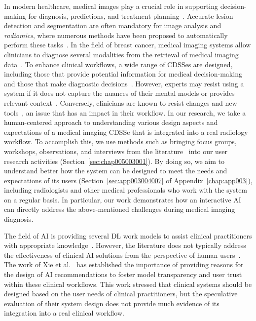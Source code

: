 In modern healthcare, medical images play a crucial role in supporting decision-making for diagnosis, predictions, and treatment planning~\cite{liang2019deep}.
Accurate lesion detection and segmentation are often mandatory for image analysis and {\it radiomics}, where numerous methods have been proposed to automatically perform these tasks~\cite{litjens2017survey}.
In the field of breast cancer, medical imaging systems allow clinicians to diagnose several modalities from the retrieval of medical imaging data~\cite{seifabadi2019correlation}.
To enhance clinical workflows, a wide range of \acp{CDSSe} are designed, including those that provide potential information for medical decision-making and those that make diagnostic decisions~\cite{10.1145/3290605.3300234, GU2020101858}.
However, experts may resist using a system if it does not capture the nuances of their mental models or provides relevant context~\cite{10.1145/2858036.2858373}.
Conversely, clinicians are known to resist changes and new tools~\cite{10.1145/3132272.3134111}, an issue that has an impact in their workflow.
In our research, we take a human-centered approach to understanding various design aspects and expectations of a medical imaging \ac{CDSSe} that is integrated into a real radiology workflow.
To accomplish this, we use methods such as bringing focus groups, workshops, observations, and interviews from the literature~\cite{Lim:2019:DDI:3319806.3301427} into our user research activities (Section~\ref{sec:chap005003001}).
By doing so, we aim to understand better how the system can be designed to meet the needs and expectations of its users (Section~\ref{sec:app003004007} of Appendix~\ref{chap:app003}), including radiologists and other medical professionals who work with the system on a regular basis.
In particular, our work demonstrates how an interactive \ac{AI} can directly address the above-mentioned challenges during medical imaging diagnosis.

The field of \ac{AI} is providing several \ac{DL} work models to assist clinical practitioners with appropriate knowledge~\cite{9540298, 9730804}.
However, the literature does not typically address the effectiveness of clinical \ac{AI} solutions from the perspective of human users~\cite{CALISTO2021102607}.
The work of Xie et al.~\cite{10.1145/3313831.3376807} has established the importance of providing reasons for the design of \ac{AI} recommendations to foster model transparency and user trust within these clinical workflows.
This work stressed that clinical systems should be designed based on the user needs of clinical practitioners, but the speculative evaluation of their system design does not provide much evidence of its integration into a real clinical workflow.

